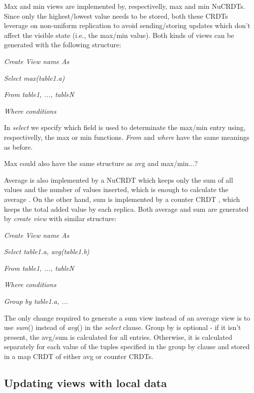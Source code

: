 \documentclass{vldb}
\newcommand{\grumbler}[2]{{\color{red}{\bf #1:} #2}}
\newcommand{\andre}[1]{\grumbler{andre}{#1}}
\newcommand{\emphvspace}{0.5\baselineskip}
\newcommand{\firstblockemph}[1]{\vspace{\emphvspace}\hspace{2em}\emph{#1}}
\newcommand{\middleblockemph}[1]{\hspace{2em}\emph{#1}}
\newcommand{\lastblockemph}[1]{\hspace{2em}\emph{#1}\vspace{\emphvspace}}
\begin{document}
Max and min views are implemented by, respectivelly, max and min NuCRDTs.
Since only the highest/lowest value needs to be stored, both these CRDTs leverage on non-uniform replication to avoid sending/storing updates which don't affect the visible state (i.e., the max/min value).
Both kinds of views can be generated with the following structure:

\firstblockemph{Create View name As}

\middleblockemph{Select max(table1.a)}

\middleblockemph{From table1, ..., tableN}

\lastblockemph{Where conditions}

In \emph{select} we specify which field is used to determinate the max/min entry using, respectivelly, the max or min functions.
\emph{From} and \emph{where} have the same meanings as before.

\andre{Max could also have the same structure as avg and max/min...?}

Average is also implemented by a NuCRDT which keeps only the sum of all values and the number of values inserted, which is enough to calculate the average \cite{???}.
On the other hand, sum is implemented by a counter CRDT \cite{???}, which keeps the total added value by each replica.
Both average and sum are generated by \emph{create view} with similar structure:

\firstblockemph{Create View name As}

\middleblockemph{Select table1.a, avg(table1.b)}

\middleblockemph{From table1, ..., tableN}

\middleblockemph{Where conditions}

\lastblockemph{Group by table1.a, ...}

The only change required to generate a sum view instead of an average view is to use \emph{sum}() instead of \emph{avg}() in the \emph{select} clause.
Group by is optional - if it isn't present, the avg/sum is calculated for all entries. Otherwise, it is calculated separately for each value of the tuples specified in the group by clause and stored in a map CRDT of either avg or counter CRDTs.

\subsection{Updating views with local data}
\end{document}
